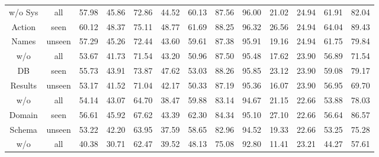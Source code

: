 \begin{table}
\begin{adjustbox}{max width=\textwidth}
\begin{tabular}{|c|c|c|c|c|c|c|c|c|c|c|c|c|}
            {w/o Sys}              & all     & 57.98    & 45.86    & 72.86          & 44.52          & 60.13          & 87.56                     & 96.00     & 21.02                     & 24.94                     & 61.91   & 82.04    \\
            {Action}               & seen    & 60.12    & 48.37    & 75.11          & 48.77          & 61.69          & 88.25                     & 96.32     & 26.56                     & 24.94                     & 64.04   & 89.43    \\
            {Names}                & unseen  & 57.29    & 45.26    & 72.44          & 43.60          & 59.61          & 87.38                     & 95.91     & 19.16                     & 24.94                     & 61.75   & 79.84    \\ \hline
            {w/o}                  & all     & 53.67    & 41.73    & 71.54          & 43.20          & 50.96          & 87.50                     & 95.48     & 17.62                     & 23.90                     & 56.89   & 71.54    \\
            {DB}                   & seen    & 55.73    & 43.91    & 73.87          & 47.62          & 53.03          & 88.26                     & 95.85     & 23.12                     & 23.90                     & 59.08   & 79.17    \\
            {Results}              & unseen  & 53.17    & 41.52    & 71.04          & 42.17          & 50.33          & 87.19                     & 95.36     & 16.07                     & 23.90                     & 56.95   & 69.70    \\ \hline
            {w/o}                  & all     & 54.14    & 43.07    & 64.70          & 38.47          & 59.88          & 83.14                     & 94.67     & 21.15                     & 22.66                     & 53.88   & 78.03    \\
            {Domain}               & seen    & 56.61    & 45.92    & 67.62          & 43.39          & 62.30          & 84.34                     & 95.10     & 27.10                     & 22.66                     & 56.64   & 86.57    \\
            {Schema}               & unseen  & 53.22    & 42.20    & 63.95          & 37.59          & 58.65          & 82.96                     & 94.52     & 19.33                     & 22.66                     & 53.25   & 75.28    \\ \hline
            {w/o}                  & all     & 40.38    & 30.71    & 62.47          & 39.52          & 48.13          & 75.08                     & 92.80     & 11.41                     & 23.21                     & 44.27   & 57.61    \\

\end{tabular}
\end{adjustbox}
\end{table}
